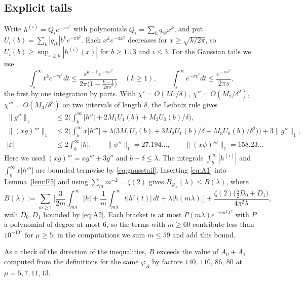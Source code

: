 \documentclass[11pt]{amsart}
\theoremstyle{definition}
\theoremstyle{remark}
\numberwithin{equation}{section}
\begin{document}
\subsection{Explicit tails}
Write $h^{(i)}=Q_ie^{-\pi x^2}$ with polynomials $Q_i=\sum_kq_{ik}x^k$, and put $U_i(b)=\sum_k|q_{ik}|b^ke^{-\pi b^2}$. Each $x^ke^{-\pi x^2}$ decreases for $x\ge\sqrt{k/2\pi}$, so $U_i(b)\ge\sup_{x\ge b}|h^{(i)}(x)|$ for $b\ge1.13$ and $i\le3$. For the Gaussian tails we use
\begin{equation}\label{eq:gausstail}
\int_s^\infty t^ke^{-\pi t^2}dt\le\frac{s^{k-1}e^{-\pi s^2}}{2\pi\big(1-\frac{k-1}{2\pi s^2}\big)}\quad(k\ge1),\qquad \int_s^\infty e^{-\pi t^2}dt\le\frac{e^{-\pi s^2}}{2\pi s},
\end{equation}
the first by one integration by parts. With $\chi'=O(M_1/\delta)$, $\chi''=O(M_2/\delta^2)$, $\chi'''=O(M_3/\delta^3)$ on two intervals of length $\delta$, the Leibniz rule gives
\begin{equation}\label{eq:A2}
\begin{aligned}
\|g''\|_1&\le2\Big(\textstyle\int_b^\infty|h''|+2M_1U_1(b)+M_2U_0(b)/\delta\Big),\\
\|(xg)'''\|_1&\le2\Big(\textstyle\int_b^\infty x|h'''|+\lambda\big(3M_1U_2(b)+3M_2U_1(b)/\delta+M_3U_0(b)/\delta^2\big)\Big)+3\|g''\|_1,\\
|\varepsilon|&\le2\textstyle\int_b^\infty|h|,\qquad \|\psi''\|_1=27.194\ldots,\qquad \|(x\psi)'''\|_1=158.23\ldots
\end{aligned}
\end{equation}
Here we used $(xg)'''=xg'''+3g''$ and $b+\delta\le\lambda$. The integrals $\int_b^\infty|h^{(i)}|$ and $\int_b^\infty x|h'''|$ are bounded termwise by \eqref{eq:gausstail}. Inserting \eqref{eq:A1} into Lemma~\ref{lem:F5} and using $\sum_mm^{-2}=\zeta(2)$ gives $B_{\varphi_A}(\lambda)\le B(\lambda)$, where
\begin{equation}\label{eq:Bdef}
B(\lambda):=\sum_{m\ge1}\Big[\frac{3}{2m}\int_{m\lambda}^\infty|h|+\frac1m\int_{m\lambda}^\infty t|h'(t)|\,dt+\lambda|h(m\lambda)|\Big]+\frac{\zeta(2)\big(\frac52D_0+D_1\big)}{4\pi^2\lambda},
\end{equation}
with $D_0,D_1$ bounded by \eqref{eq:A2}. Each bracket is at most $P(m\lambda)e^{-\pi m^2\lambda^2}$ with $P$ a polynomial of degree at most $6$, so the terms with $m\ge60$ contribute less than $10^{-10^4}$ for $\mu\ge5$; in the computations we sum $m\le59$ and add this bound.

As a check of the direction of the inequalities, $B$ exceeds the value of $A_0+A_1$ computed from the definitions for the same $\varphi_A$ by factors $140$, $110$, $86$, $80$ at $\mu=5,7,11,13$.
\end{document}
